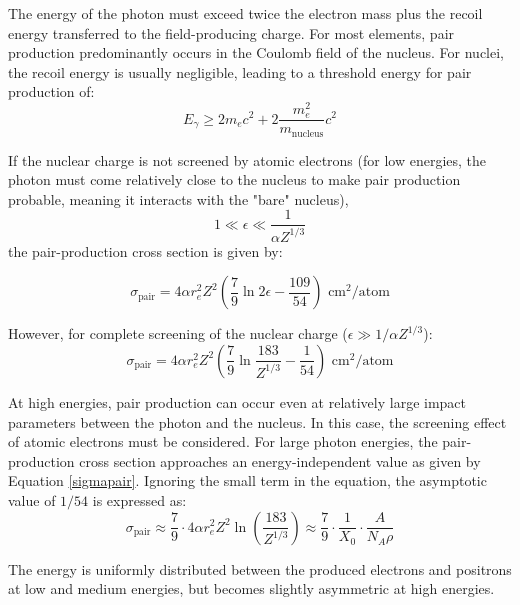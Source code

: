 The energy of the photon must exceed twice the electron 
mass plus the recoil energy transferred to the field-producing 
charge. For most elements, pair production predominantly 
occurs in the Coulomb field of the nucleus. For nuclei, 
the recoil energy is usually negligible, leading to a 
threshold energy for pair production of:
\begin{equation}
    E_{\gamma} \geq 2m_e c^2 + 2 \frac{m_e^2}{m_{\text{nucleus}}} c^2
\end{equation}

If the nuclear charge is not screened by atomic electrons 
(for low energies, the photon must come relatively close to 
the nucleus to make pair production probable, meaning it 
interacts with the "bare" nucleus),
\begin{equation}
    1 \ll \epsilon \ll \frac{1}{\alpha Z^{1/3}}
\end{equation}
the pair-production cross section is given by:

\begin{equation}
    \sigma_{\text{pair}} = 4 \alpha r_e^2 Z^2 \left(\frac{7}{9} \ln 2 \epsilon - \frac{109}{54}\right) \text{ cm}^2/\text{atom}
\end{equation}

However, for complete screening of the nuclear charge ($\epsilon \gg 1/\alpha Z^{1/3}$):
\begin{equation}\label{sigmapair}
    \sigma_{\text{pair}} = 4 \alpha r_e^2 Z^2 \left(\frac{7}{9} \ln \frac{183}{Z^{1/3}} - \frac{1}{54}\right) \text{ cm}^2/\text{atom}
\end{equation}

At high energies, pair production can occur even 
at relatively large impact parameters between the 
photon and the nucleus. In this case, the screening 
effect of atomic electrons must be considered. For 
large photon energies, the pair-production cross 
section approaches an energy-independent value as given by
 Equation \ref{sigmapair}. Ignoring the small term in the equation, 
 the asymptotic value of $1/54$ is expressed as:
\begin{equation}
    \sigma_{\text{pair}} \approx \frac{7}{9} \cdot 4 \alpha r_e^2 Z^2 \ln\left(\frac{183}{Z^{1/3}}\right) \approx \frac{7}{9} \cdot \frac{1}{X_0} \cdot \frac{A}{N_A \rho}
    \label{eq:paircross_radiationlength}
\end{equation}

The energy is uniformly distributed between the produced 
electrons and positrons at low and medium energies, but becomes 
slightly asymmetric at high energies.

